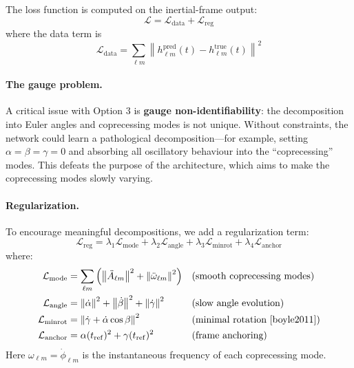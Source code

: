 \documentclass[11pt,a4paper]{article}
\newcommand{\hlm}{h_{\ell m}}
\begin{document}
The loss function is computed on the inertial-frame output:
\begin{equation}
    \mathcal{L} = \mathcal{L}_{\text{data}} + \mathcal{L}_{\text{reg}}
    \label{eq:loss}
\end{equation}
where the data term is
\begin{equation}
    \mathcal{L}_{\text{data}} = \sum_{\ell m} \left\| \hlm^{\text{pred}}(t) - \hlm^{\text{true}}(t) \right\|^2
\end{equation}

\paragraph{The gauge problem.}
A critical issue with Option 3 is \textbf{gauge non-identifiability}: the decomposition into Euler angles and coprecessing modes is not unique. Without constraints, the network could learn a pathological decomposition---for example, setting $\alpha = \beta = \gamma = 0$ and absorbing all oscillatory behaviour into the ``coprecessing'' modes. This defeats the purpose of the architecture, which aims to make the coprecessing modes slowly varying.

\paragraph{Regularization.}
To encourage meaningful decompositions, we add a regularization term:
\begin{equation}
    \mathcal{L}_{\text{reg}} = \lambda_1 \mathcal{L}_{\text{mode}} + \lambda_2 \mathcal{L}_{\text{angle}} + \lambda_3 \mathcal{L}_{\text{minrot}} + \lambda_4 \mathcal{L}_{\text{anchor}}
    \label{eq:regularization}
\end{equation}
where:
\begin{align}
    \mathcal{L}_{\text{mode}} &= \sum_{\ell m} \left( \left\| \ddot{A}_{\ell m} \right\|^2 + \left\| \ddot{\omega}_{\ell m} \right\|^2 \right) && \text{(smooth coprecessing modes)} \\
    \mathcal{L}_{\text{angle}} &= \left\| \dot{\alpha} \right\|^2 + \left\| \dot{\beta} \right\|^2 + \left\| \dot{\gamma} \right\|^2 && \text{(slow angle evolution)} \\
    \mathcal{L}_{\text{minrot}} &= \left\| \dot{\gamma} + \dot{\alpha}\cos\beta \right\|^2 && \text{(minimal rotation \cite{boyle2011})} \\
    \mathcal{L}_{\text{anchor}} &= \alpha(t_{\rm ref})^2 + \gamma(t_{\rm ref})^2 && \text{(frame anchoring)}
\end{align}
Here $\omega_{\ell m} = \dot{\phi}_{\ell m}$ is the instantaneous frequency of each coprecessing mode.
\end{document}

